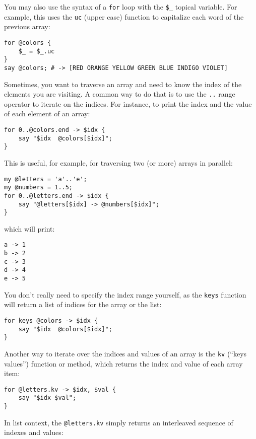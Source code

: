 You may also use the syntax of a {\tt for} loop with the 
\verb'$_' topical variable. For example, this uses the
{\tt uc} (upper case) function to capitalize each word of 
the previous array:

\begin{verbatim}
for @colors { 
    $_ = $_.uc 
}
say @colors; # -> [RED ORANGE YELLOW GREEN BLUE INDIGO VIOLET]
\end{verbatim}
%

Sometimes, you want to traverse an array and need to know the 
index of the elements you are visiting. A common way to do 
that is to use the \verb'..' range operator to iterate on 
the indices. For instance, to print the index and the value of each element of an array:

\begin{verbatim}
for 0..@colors.end -> $idx { 
    say "$idx  @colors[$idx]"; 
}
\end{verbatim}

This is useful, for example, for traversing two (or more) arrays 
in parallel:

\begin{verbatim}
my @letters = 'a'..'e';
my @numbers = 1..5;
for 0..@letters.end -> $idx { 
    say "@letters[$idx] -> @numbers[$idx]"; 
}
\end{verbatim}
%

which will print:
\begin{verbatim}
a -> 1
b -> 2
c -> 3
d -> 4
e -> 5
\end{verbatim}

You don't really need to specify the index range yourself, as 
the {\tt keys} function will return a list of indices for 
the array or the list:

\begin{verbatim}
for keys @colors -> $idx { 
    say "$idx  @colors[$idx]"; 
}
\end{verbatim}

Another way to iterate over the indices and values of an 
array is the {\tt kv} (``keys values'') function or method, 
which returns the index and value of each array item:

\begin{verbatim}
for @letters.kv -> $idx, $val { 
    say "$idx $val";
}
\end{verbatim}

In list context, the \verb'@letters.kv' simply returns an 
interleaved sequence of indexes and values:

